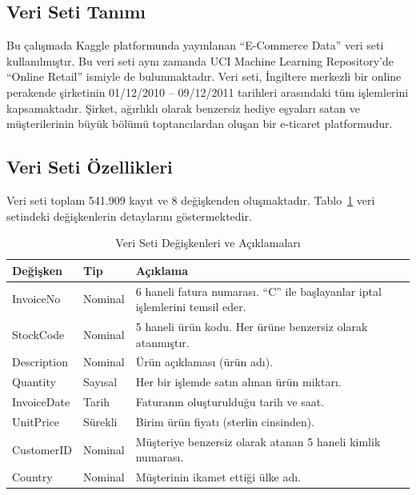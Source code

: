 \documentclass[conference]{IEEEtran}
\begin{document}
\subsection{Veri Seti Tanımı}

Bu çalışmada Kaggle platformunda yayınlanan ``E-Commerce Data'' \cite{kaggle_ecommerce} veri seti kullanılmıştır. Bu veri seti aynı zamanda UCI Machine Learning Repository'de ``Online Retail'' \cite{uci_retail} ismiyle de bulunmaktadır. Veri seti, İngiltere merkezli bir online perakende şirketinin 01/12/2010 -- 09/12/2011 tarihleri arasındaki tüm işlemlerini kapsamaktadır. Şirket, ağırlıklı olarak benzersiz hediye eşyaları satan ve müşterilerinin büyük bölümü toptancılardan oluşan bir e-ticaret platformudur.

\subsection{Veri Seti Özellikleri}

Veri seti toplam 541.909 kayıt ve 8 değişkenden oluşmaktadır. Tablo~\ref{tab:features} veri setindeki değişkenlerin detaylarını göstermektedir.

\begin{table}[h]
\centering
\caption{Veri Seti Değişkenleri ve Açıklamaları}
\label{tab:features}
\begin{tabular}{p{1.8cm}p{1.3cm}p{4.5cm}}
\toprule
\textbf{Değişken} & \textbf{Tip} & \textbf{Açıklama} \\
\midrule
InvoiceNo & Nominal & 6 haneli fatura numarası. ``C'' ile başlayanlar iptal işlemlerini temsil eder. \\
StockCode & Nominal & 5 haneli ürün kodu. Her ürüne benzersiz olarak atanmıştır. \\
Description & Nominal & Ürün açıklaması (ürün adı). \\
Quantity & Sayısal & Her bir işlemde satın alınan ürün miktarı. \\
InvoiceDate & Tarih & Faturanın oluşturulduğu tarih ve saat. \\
UnitPrice & Sürekli & Birim ürün fiyatı (sterlin cinsinden). \\
CustomerID & Nominal & Müşteriye benzersiz olarak atanan 5 haneli kimlik numarası. \\
Country & Nominal & Müşterinin ikamet ettiği ülke adı. \\
\bottomrule
\end{tabular}
\end{table}
\end{document}

